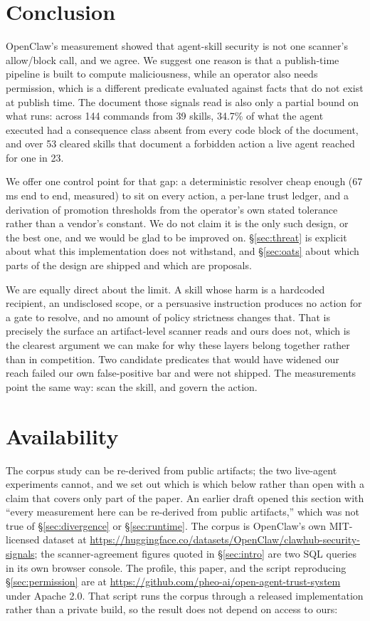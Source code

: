 \documentclass[10pt]{article}
\begin{document}
\section{Conclusion}

OpenClaw's measurement showed that agent-skill security is not one scanner's
allow/block call, and we agree. We suggest one reason is that a publish-time pipeline
is built to compute maliciousness, while an operator also needs permission, which is
a different predicate evaluated against facts that do not exist at publish time. The
document those signals read is also only a partial bound on what runs: across 144
commands from 39 skills, 34.7\% of what the agent executed had a consequence class
absent from every code block of the document, and over 53 cleared skills that
document a forbidden action a live agent reached for one in 23.

We offer one control point for that gap: a deterministic resolver cheap enough
(67\,ms end to end, measured) to sit on every action, a per-lane trust ledger, and a derivation of
promotion thresholds from the operator's own stated tolerance rather than a vendor's
constant. We do not claim it is the only such design, or the best one, and we would
be glad to be improved on. \S\ref{sec:threat} is explicit about what this
implementation does not withstand, and \S\ref{sec:oats} about which parts of the
design are shipped and which are proposals.

We are equally direct about the limit. A skill whose harm is a hardcoded recipient,
an undisclosed scope, or a persuasive instruction produces no action for a gate to
resolve, and no amount of policy strictness changes that. That is precisely the
surface an artifact-level scanner reads and ours does not, which is the clearest
argument we can make for why these layers belong together rather than in competition.
Two candidate predicates that would have widened our reach failed our own
false-positive bar and were not shipped. The measurements point the same way: scan
the skill, and govern the action.

\section*{Availability}

The corpus study can be re-derived from public artifacts; the two live-agent
experiments cannot, and we set out which is which below rather than open with a claim
that covers only part of the paper. An earlier draft opened this section with ``every
measurement here can be re-derived from public artifacts,'' which was not true of
\S\ref{sec:divergence} or \S\ref{sec:runtime}. The corpus is
OpenClaw's own MIT-licensed dataset at
\url{https://huggingface.co/datasets/OpenClaw/clawhub-security-signals}; the
scanner-agreement figures quoted in \S\ref{sec:intro} are two SQL queries in its own
browser console. The profile, this paper, and the script reproducing
\S\ref{sec:permission} are at
\url{https://github.com/pheo-ai/open-agent-trust-system} under Apache 2.0. That
script runs the corpus through a released implementation rather than a private build,
so the result does not depend on access to ours:
\end{document}
